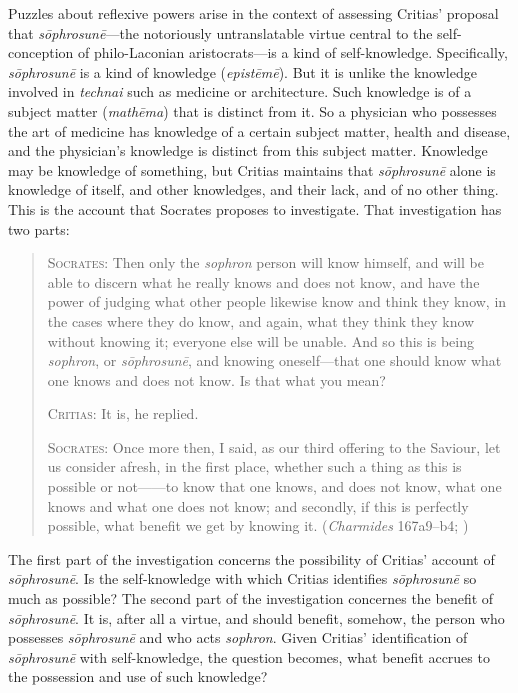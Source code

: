 Puzzles about reflexive powers arise in the context of assessing Critias' proposal that \emph{sōphrosunē}—the notoriously untranslatable virtue central to the self-conception of philo-Laconian aristocrats—is a kind of self-knowledge. Specifically, \emph{sōphrosunē} is a kind of knowledge (\emph{epistēmē}). But it is unlike the knowledge involved in \emph{technai} such as medicine or architecture. Such knowledge is of a subject matter (\emph{mathēma}) that is distinct from it. So a physician who possesses the art of medicine has knowledge of a certain subject matter, health and disease, and the physician's knowledge is distinct from this subject matter. Knowledge may be knowledge of something, but Critias maintains that \emph{sōphrosunē} alone is knowledge of itself, and other knowledges, and their lack, and of no other thing. This is the account that Socrates proposes to investigate. That investigation has two parts:
\begin{quotation}
	\textsc{Socrates}: Then only the \emph{sophron} person will know himself, and will be able to discern what he really knows and does not know, and have the power of judging what other people likewise know and think they know, in the cases where they do know, and again, what they think they know without knowing it; everyone else will be unable. And so this is being \emph{sophron}, or \emph{sōphrosunē}, and knowing oneself—that one should know what one knows and does not know. Is that what you mean?
	
	\textsc{Critias}: It is, he replied.
	
	\textsc{Socrates}: Once more then, I said, as our third offering to the Saviour, let us consider afresh, in the first place, whether such a thing as this is possible or not——to know that one knows, and does not know, what one knows and what one does not know; and secondly, if this is perfectly possible, what benefit we get by knowing it. (\emph{Charmides} 167a9–b4; \citealt[57]{Lamb:1927qw})
\end{quotation}
The first part of the investigation concerns the possibility of Critias' account of \emph{sōphrosunē}. Is the self-knowledge with which Critias identifies \emph{sōphrosunē} so much as possible? The second part of the investigation concernes the benefit of \emph{sōphrosunē}. It is, after all a virtue, and should benefit, somehow, the person who possesses \emph{sōphrosunē} and who acts \emph{sophron}. Given Critias' identification of \emph{sōphrosunē} with self-knowledge, the question becomes, what benefit accrues to the possession and use of such knowledge?
 
